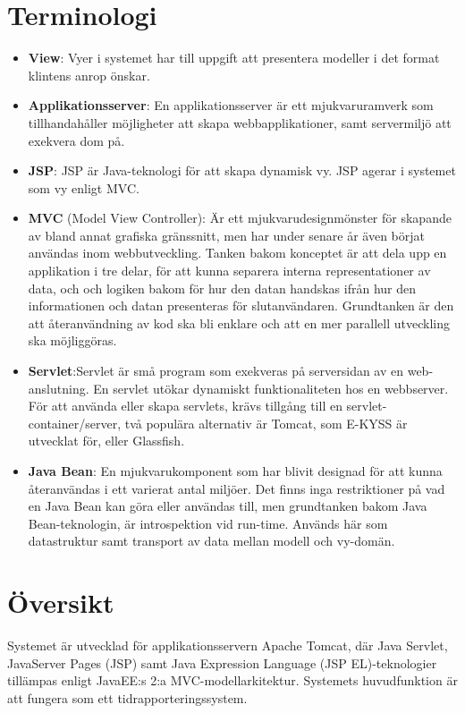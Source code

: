 \documentclass[paper=a4, fontsize=11pt,twoside]{article}
\begin{document}
\section{Terminologi}
\begin{itemize}
\item \textbf{View}: Vyer i systemet har till uppgift att presentera modeller i
det format klintens anrop önskar.
\item \textbf{Applikationsserver}: En applikationsserver är ett mjukvaruramverk
som tillhandahåller möjligheter att skapa webbapplikationer, samt servermiljö att exekvera dom på.
\item \textbf{JSP}: JSP är Java-teknologi för att skapa dynamisk vy. JSP agerar
i systemet som vy enligt MVC. 
\item \textbf{MVC} (Model View Controller): Är ett mjukvarudesignmönster för skapande av bland annat grafiska gränssnitt, men har under senare år även börjat användas inom webbutveckling. Tanken bakom konceptet är att dela upp en applikation i tre delar, för att kunna separera interna 
representationer av data, och och logiken bakom för hur den datan handskas ifrån hur den informationen och datan presenteras för slutanvändaren. Grundtanken är den att återanvändning av kod ska bli enklare och att en mer parallell utveckling ska möjliggöras.\item \textbf{Servlet}:Servlet är små program som exekveras på serversidan av en
web-anslutning. En servlet utökar dynamiskt funktionaliteten hos en webbserver. För att använda eller skapa servlets, krävs tillgång till en servlet-container/server, två populära alternativ är Tomcat, som E-KYSS är utvecklat för, eller Glassfish.
\item \textbf{Java Bean}: En mjukvarukomponent som har blivit designad för att
kunna återanvändas i ett varierat antal miljöer. Det finns inga restriktioner på vad en Java Bean kan göra eller användas till, men grundtanken bakom Java Bean-teknologin, är introspektion vid run-time. Används här som datastruktur samt transport av data mellan modell och vy-domän.
\end{itemize}

\newpage
\section{Översikt}
Systemet är utvecklad för applikationsservern Apache Tomcat, där Java Servlet, JavaServer Pages (JSP) samt Java Expression Language (JSP EL)-teknologier tillämpas enligt JavaEE:s 2:a MVC-modellarkitektur. Systemets huvudfunktion är att fungera som ett tidrapporteringssystem.
\end{document}

